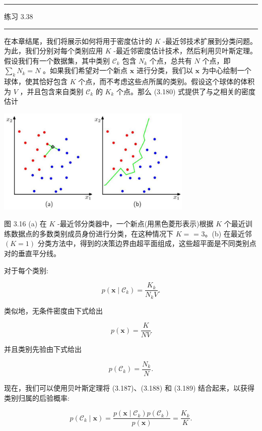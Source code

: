 \documentclass[10pt]{report}
\newcommand{\HRule}{\begin{center}\rule{0.9\linewidth}{0.2mm}\end{center}}
\begin{document}
\HRule

练习 3.38

\HRule

在本章结尾，我们将展示如何将用于密度估计的 \(K\) -最近邻技术扩展到分类问题。为此，我们分别对每个类别应用 \(K\) -最近邻密度估计技术，然后利用贝叶斯定理。假设我们有一个数据集，其中类别 \({\mathcal{C}}_{k}\) 包含 \({N}_{k}\) 个点，总共有 \(N\) 个点，即 \(\mathop{\sum }\limits_{k}{N}_{k} = N\) 。如果我们希望对一个新点 \(\mathbf{x}\) 进行分类，我们以 \(\mathbf{x}\) 为中心绘制一个球体，使其恰好包含 \(K\) 个点，而不考虑这些点所属的类别。假设这个球体的体积为 \(V\) ，并且包含来自类别 \({\mathcal{C}}_{k}\) 的 \({K}_{k}\) 个点。那么 (3.180) 式提供了与之相关的密度估计

\begin{center}
\includegraphics[max width=0.7\textwidth]{images/0194e279-9b28-703a-88f4-c3ac21e2010d_123_654_342_888_480_0.jpg}
\end{center}
\hspace*{3em} 

图 3.16 (a) 在 \(K\) -最近邻分类器中，一个新点(用黑色菱形表示)根据 \(K\) 个最近训练数据点的多数类别成员身份进行分类，在这种情况下 \(K =\) = 3。(b) 在最近邻 \(\left( {K = 1}\right)\) 分类方法中，得到的决策边界由超平面组成，这些超平面是不同类别点对的垂直平分线。

对于每个类别:

\[
p\left( {\mathbf{x} \mid  {\mathcal{C}}_{k}}\right)  = \frac{{K}_{k}}{{N}_{k}V}. \tag{3.187}
\]

类似地，无条件密度由下式给出

\[
p\left( \mathbf{x}\right)  = \frac{K}{NV} \tag{3.188}
\]

并且类别先验由下式给出

\[
p\left( {\mathcal{C}}_{k}\right)  = \frac{{N}_{k}}{N}. \tag{3.189}
\]

现在，我们可以使用贝叶斯定理将 (3.187)、(3.188) 和 (3.189) 结合起来，以获得类别归属的后验概率:

\[
p\left( {{\mathcal{C}}_{k} \mid  \mathbf{x}}\right)  = \frac{p\left( {\mathbf{x} \mid  {\mathcal{C}}_{k}}\right) p\left( {\mathcal{C}}_{k}\right) }{p\left( \mathbf{x}\right) } = \frac{{K}_{k}}{K}. \tag{3.190}
\]
\end{document}
